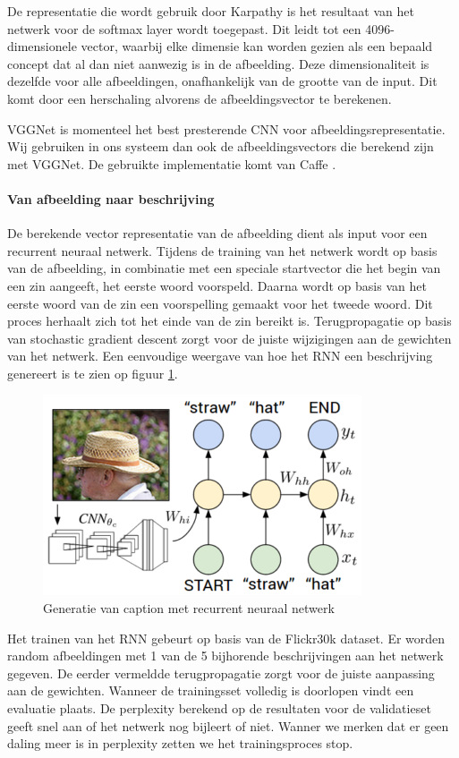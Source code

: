 De representatie die wordt gebruik door Karpathy is het resultaat van het netwerk voor de softmax layer wordt toegepast. Dit leidt tot een 4096-dimensionele vector, waarbij elke dimensie kan worden gezien als een bepaald concept dat al dan niet aanwezig is in de afbeelding. Deze dimensionaliteit is dezelfde voor alle afbeeldingen, onafhankelijk van de grootte van de input. Dit komt door een herschaling alvorens de afbeeldingsvector te berekenen.

VGGNet is momenteel het best presterende CNN voor afbeeldingsrepresentatie. Wij gebruiken in ons systeem dan ook de afbeeldingsvectors die berekend zijn met VGGNet. De gebruikte implementatie komt van Caffe .

\paragraph{Van afbeelding naar beschrijving}
De berekende vector representatie van de afbeelding dient als input voor een recurrent neuraal netwerk. Tijdens de training van het netwerk wordt op basis van de afbeelding, in combinatie met een speciale startvector die het begin van een zin aangeeft, het eerste woord voorspeld. Daarna wordt op basis van het eerste woord van de zin een voorspelling gemaakt voor het tweede woord. Dit proces herhaalt zich tot het einde van de zin bereikt is. Terugpropagatie op basis van stochastic gradient descent zorgt voor de juiste wijzigingen aan de gewichten van het netwerk. Een eenvoudige weergave van hoe het RNN een beschrijving genereert is te zien op figuur \ref{fig:rnntraining}.

\begin{figure}[tb]
    \centering
    \includegraphics[width=0.5\linewidth]{Images/karpathy.PNG}
    \caption{Generatie van caption met recurrent neuraal netwerk}
\label{fig:rnntraining}
\end{figure}

Het trainen van het RNN gebeurt op basis van de Flickr30k dataset. Er worden random afbeeldingen met 1 van de 5 bijhorende beschrijvingen aan het netwerk gegeven. De eerder vermeldde terugpropagatie zorgt voor de juiste aanpassing aan de gewichten. Wanneer de trainingsset volledig is doorlopen vindt een evaluatie plaats. De perplexity berekend op de resultaten voor de validatieset geeft snel aan of het netwerk nog bijleert of niet. Wanner we merken dat er geen daling meer is in perplexity zetten we het trainingsproces stop.

